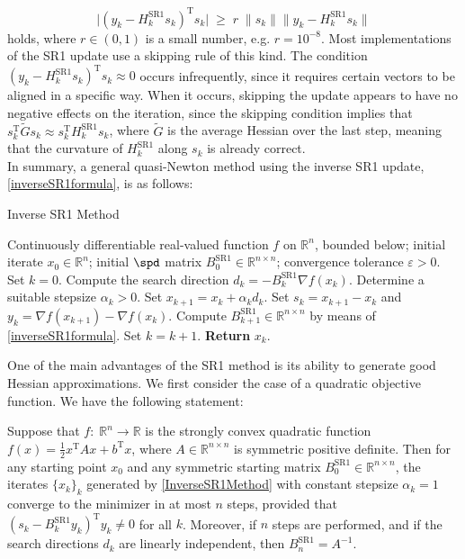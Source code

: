 \begin{equation}\label{CautiousSR1}
    \lvert (y_k - H^\mathrm{SR1}_k s_k)^{\mathrm{T}} s_k \lvert \; \geq \; r \; \lVert s_k \rVert \lVert y_k - H^\mathrm{SR1}_k s_k \rVert 
\end{equation}
holds, where $r \in (0, 1)$ is a small number, e.g. $r = 10^{−8}$. Most implementations of the SR1 update use a skipping rule of this kind. The condition $(y_k - H^\mathrm{SR1}_k s_k)^{\mathrm{T}} s_k \approx 0$ occurs infrequently, since it requires certain vectors to be aligned in a specific way. When it occurs, skipping the update appears to have no negative effects on the iteration, since the skipping condition implies that $s^{\mathrm{T}}_k \tilde{G} s_k \approx s^{\mathrm{T}}_k H^\mathrm{SR1}_k s_k$, where $\tilde{G}$ is the average Hessian over the last step, meaning that the curvature of $H^\mathrm{SR1}_k$ along $s_k$ is already correct. \\
In summary, a general quasi-Newton method using the inverse SR1 update, \cref{inverseSR1formula}, is as follows:
\begin{algorithm}[H]
    \caption{Inverse SR1 Method}\label{InverseSR1Method}
    \begin{algorithmic}[1]
        \State Continuously differentiable real-valued function $f$ on $\mathbb{R}^n$, bounded below; initial iterate $x_0 \in \mathbb{R}^n$; initial $\spd$ matrix $B^{\mathrm{SR1}}_0 \in \mathbb{R}^{n \times n}$; convergence tolerance $\varepsilon > 0$. Set $k = 0$.
            \State Compute the search direction $d_k = - B^{\mathrm{SR1}}_k \nabla f(x_k)$.
            \State Determine a suitable stepsize $\alpha_k > 0$.
            \State Set $x_{k+1} = x_k + \alpha_k d_k$.
            \State Set $s_k = x_{k+1} - x_k$ and $y_k = \nabla f(x_{k+1}) - \nabla f(x_k)$.
            \State Compute $B^{\mathrm{SR1}}_{k+1} \in \mathbb{R}^{n \times n}$ by means of \cref{inverseSR1formula}. 
            \State Set $k = k+1$.
        \EndWhile
        \State \textbf{Return} $x_k$.
    \end{algorithmic}
\end{algorithm}
One of the main advantages of the SR1 method is its ability to generate good Hessian approximations. We first consider the case of a quadratic objective function. We have the following statement:
\begin{theorem}
    Suppose that $f \colon \; \mathbb{R}^n \to \mathbb{R}$ is the strongly convex quadratic function $f(x) = \frac{1}{2} x^{\mathrm{T}} A x + b^{\mathrm{T}} x$, where $A \in \mathbb{R}^{n \times n}$ is symmetric positive definite. Then for any starting point $x_0$ and any symmetric starting matrix $B^{\mathrm{SR1}}_0 \in \mathbb{R}^{n \times n}$, the iterates $\{x_k\}_k$ generated by \cref{InverseSR1Method} with constant stepsize $\alpha_k = 1$ converge to the minimizer in at most $n$ steps, provided that $(s_k - B^\mathrm{SR1}_k y_k)^{\mathrm{T}} y_k \neq 0$ for all $k$. Moreover, if $n$ steps are performed, and if the search directions $d_k$ are linearly independent, then $B^{\mathrm{SR1}}_n = A^{−1}$.
\end{theorem}
